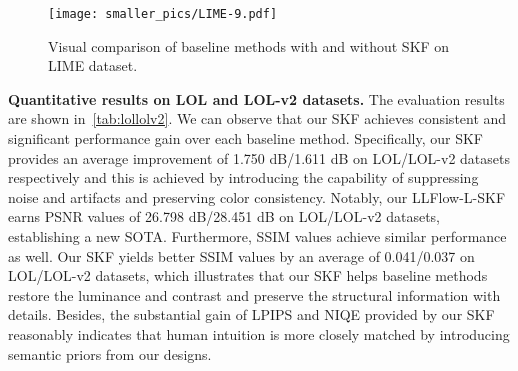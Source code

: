 \documentclass[10pt,twocolumn,letterpaper]{article}
\begin{document}
\begin{figure*}[t]
  \centering
   \texttt{[image: smaller\_pics/LIME-9.pdf]}
   \setlength{\abovecaptionskip}{-0.4cm}
   \setlength{\belowcaptionskip}{-0.6cm}
   \caption{Visual comparison of baseline methods with and without SKF on LIME dataset.}
   \label{fig:LIME_vis}
\end{figure*}

\vspace{-0.1cm}
\textbf{Quantitative results on LOL and LOL-v2 datasets.} The evaluation results are shown in~\cref{tab:lollolv2}. We can observe that our SKF achieves consistent and significant performance gain over each baseline method. Specifically, our SKF provides an average improvement of 1.750 dB/1.611 dB on LOL/LOL-v2 datasets respectively and this is achieved by introducing the capability of suppressing noise and artifacts and preserving color consistency. Notably, our LLFlow-L-SKF earns PSNR values of 26.798 dB/28.451 dB on LOL/LOL-v2 datasets, establishing a new SOTA. Furthermore, SSIM values achieve similar performance as well. Our SKF yields better SSIM values by an average of 0.041/0.037 on LOL/LOL-v2 datasets, which illustrates that our SKF helps baseline methods restore the luminance and contrast and preserve the structural information with details. Besides, the substantial gain of LPIPS and NIQE provided by our SKF reasonably indicates that human intuition is more closely matched by introducing semantic priors from our designs. 
\end{document}

